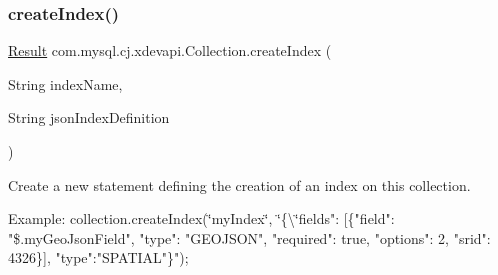 \subsubsection{\texorpdfstring{create\+Index()}{createIndex()}\hspace{0.1cm}{\footnotesize\ttfamily [2/2]}}
{\footnotesize\ttfamily \mbox{\hyperlink{interfacecom_1_1mysql_1_1cj_1_1xdevapi_1_1_result}{Result}} com.\+mysql.\+cj.\+xdevapi.\+Collection.\+create\+Index (\begin{DoxyParamCaption}\item[{String}]{index\+Name,  }\item[{String}]{json\+Index\+Definition }\end{DoxyParamCaption})}

Create a new statement defining the creation of an index on this collection. 

Example\+: collection.\+create\+Index(\char`\"{}my\+Index\char`\"{}, \char`\"{}\{\textbackslash{}\char`\"{}fields"\+: \mbox{[}\{"field"\+: "\$.my\+Geo\+Json\+Field", "type"\+: "G\+E\+O\+J\+S\+ON", "required"\+: true, "options"\+: 2, "srid"\+: 4326\}\mbox{]}, "type"\+:"S\+P\+A\+T\+I\+AL"\}");


